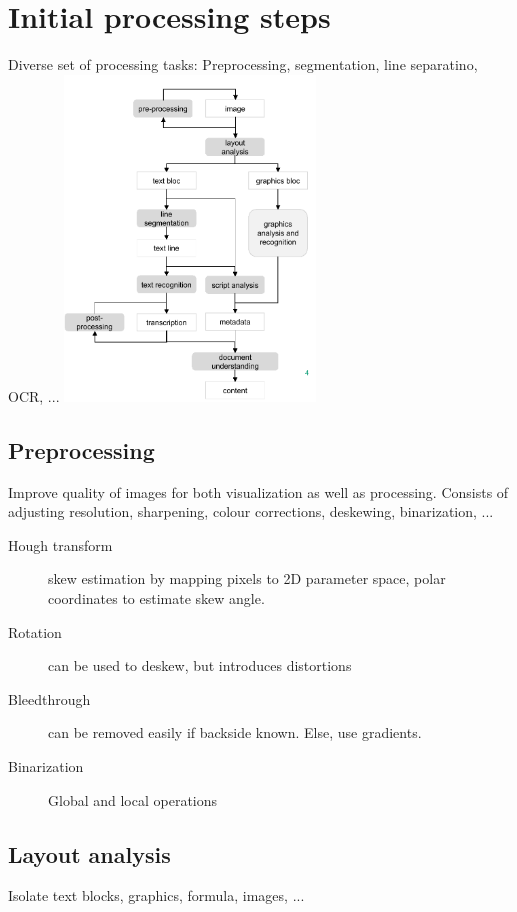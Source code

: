\section{Initial processing steps}

Diverse set of processing tasks: Preprocessing, segmentation, line separatino,
OCR, ...
\includegraphics[width=0.5\textwidth]{resources/04_processing_chain}

\subsection{Preprocessing}

Improve quality of images for both visualization as well as processing.
Consists of adjusting resolution, sharpening, colour corrections, deskewing,
binarization, ...

\begin{description}
		\item[Hough transform] skew estimation by mapping pixels to 2D
				parameter space, polar coordinates to estimate skew angle.
		\item[Rotation] can be used to deskew, but introduces distortions
		\item[Bleedthrough] can be removed easily if backside known. Else, use
				gradients.
		\item[Binarization] Global and local operations
\end{description}

\subsection{Layout analysis}

Isolate text blocks, graphics, formula, images, ...

